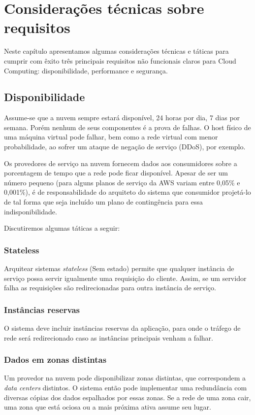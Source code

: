 \chapter{Considerações técnicas sobre requisitos}
	Neste capítulo apresentamos algumas considerações técnicas e táticas para cumprir com êxito três principais requisitos não funcionais claros para Cloud Computing: disponibilidade, performance e segurança.

\section{Disponibilidade}

	Assume-se que a nuvem sempre estará disponível, 24 horas por dia, 7 dias por semana. Porém nenhum de seus componentes é a prova de falhas. O host físico de uma máquina virtual pode falhar, bem como a rede virtual com menor probabilidade, ao sofrer um ataque de negação de serviço (DDoS), por exemplo.

	Os provedores de serviço na nuvem fornecem dados aos consumidores sobre a porcentagem de tempo que a rede pode ficar disponível. Apesar de ser um número pequeno (para alguns planos de serviço da AWS variam entre 0,05\% e 0,001\%), é de responsabilidade do arquiteto do sistema que consumidor projetá-lo de tal forma que seja incluído um plano de contingência para essa indisponibilidade.

	Discutiremos algumas táticas a seguir:

	\subsection{Stateless}
	Arquitear sistemas \textit{stateless} (Sem estado) permite que qualquer instância de serviço possa servir igualmente uma requisição do cliente. Assim, se um servidor falha as requisições são redirecionadas para outra instância de serviço.

	\subsection{Instâncias reservas}
	O sistema deve incluir instâncias reservas da aplicação, para onde o tráfego de rede será redirecionado caso as instâncias principais venham a falhar.

	\subsection{Dados em zonas distintas}
	Um provedor na nuvem pode disponibilizar zonas distintas, que correspondem a \textit{data centers} distintos. O sistema então pode implementar uma redundância com diversas cópias dos dados espalhados por essas zonas. Se a rede de uma zona cair, uma zona que está ociosa ou a mais próxima ativa assume seu lugar.
	
